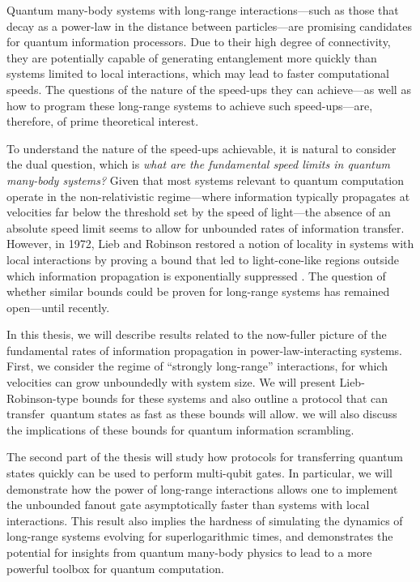 Quantum many-body systems with long-range interactions---such as those that decay as a power-law in the distance between particles---are promising candidates for quantum information processors. Due to their high degree of connectivity, they are potentially capable of generating entanglement more quickly than systems limited to local interactions, which may lead to faster computational speeds. The questions of the nature of the speed-ups they can achieve---as well as how to program these long-range systems to achieve such speed-ups---are, therefore, of prime theoretical interest.

To understand the nature of the speed-ups achievable, it is natural to consider the dual question, which is \emph{what are the fundamental speed limits in quantum many-body systems?} Given that most systems relevant to quantum computation operate in the non-relativistic regime---where information typically propagates at velocities far below the threshold set by the speed of light---the absence of an absolute speed limit seems to allow for unbounded rates of information transfer. However, in 1972, Lieb and Robinson restored a notion of locality in systems with local interactions by proving a bound that led to light-cone-like regions outside which information propagation is exponentially suppressed \cite{LR}. The question of whether similar bounds could be proven for long-range systems has remained open---until recently.

In this thesis, we will describe results related to the now-fuller picture of the fundamental rates of information propagation in power-law-interacting systems.
First, we consider the regime of ``strongly long-range'' interactions, for which velocities can grow unboundedly with system size. We will present Lieb-Robinson-type bounds for these systems and also outline a protocol that can transfer quantum states as fast as these bounds will allow. we will also discuss the implications of these bounds for quantum information scrambling.

The second part of the thesis will study how protocols for transferring quantum states quickly can be used to perform multi-qubit gates. In particular, we will demonstrate how the power of long-range interactions allows one to implement the unbounded fanout gate asymptotically faster than systems with local interactions. This result also implies the hardness of simulating the dynamics of long-range systems evolving for superlogarithmic times, and demonstrates the potential for insights from quantum many-body physics to lead to a more powerful toolbox for quantum computation.

